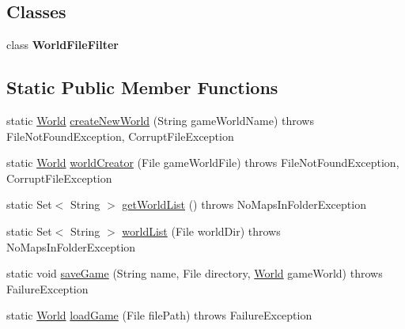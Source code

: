 \subsection*{Classes}
\begin{DoxyCompactItemize}
\item 
class {\bfseries WorldFileFilter}
\end{DoxyCompactItemize}
\subsection*{Static Public Member Functions}
\begin{DoxyCompactItemize}
\item 
static \hyperlink{classjdungeon_1_1core_1_1world_1_1_world}{World} \hyperlink{classjdungeon_1_1parser_1_1_world_assembler_a6a2e5467c12204e9cade2cb8c433830e}{createNewWorld} (String gameWorldName)  throws FileNotFoundException, CorruptFileException 
\item 
static \hyperlink{classjdungeon_1_1core_1_1world_1_1_world}{World} \hyperlink{classjdungeon_1_1parser_1_1_world_assembler_ae0b694e0b28f0c1ecfdbd6e7175b6906}{worldCreator} (File gameWorldFile)  throws FileNotFoundException, CorruptFileException 
\item 
static Set$<$ String $>$ \hyperlink{classjdungeon_1_1parser_1_1_world_assembler_aef1d683ca7ffb870302050b2847b060d}{getWorldList} ()  throws NoMapsInFolderException 
\item 
static Set$<$ String $>$ \hyperlink{classjdungeon_1_1parser_1_1_world_assembler_ab36d66b4d4eb650e942b1a2a2ad6f9ad}{worldList} (File worldDir)  throws NoMapsInFolderException 
\item 
static void \hyperlink{classjdungeon_1_1parser_1_1_world_assembler_ae732a474d80eaf90d97737593d4a9dcf}{saveGame} (String name, File directory, \hyperlink{classjdungeon_1_1core_1_1world_1_1_world}{World} gameWorld)  throws FailureException 
\item 
static \hyperlink{classjdungeon_1_1core_1_1world_1_1_world}{World} \hyperlink{classjdungeon_1_1parser_1_1_world_assembler_a430b56ec55f4b744079592d373638d49}{loadGame} (File filePath)  throws FailureException 
\end{DoxyCompactItemize}


